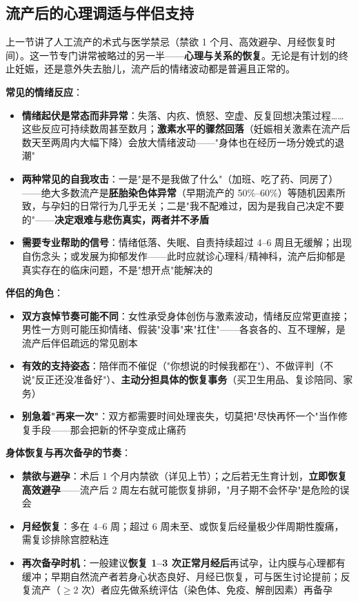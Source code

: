 \subsection{流产后的心理调适与伴侣支持}

上一节讲了人工流产的术式与医学禁忌（禁欲 1 个月、高效避孕、月经恢复时间）。这一节专门讲常被略过的另一半——\textbf{心理与关系的恢复}。无论是有计划的终止妊娠，还是意外失去胎儿，流产后的情绪波动都是普遍且正常的。

\vspace{0.5em}
\noindent\textbf{常见的情绪反应}：

\begin{itemize}
	\item \textbf{情绪起伏是常态而非异常}：失落、内疚、愤怒、空虚、反复回想决策过程……这些反应可持续数周甚至数月；\textbf{激素水平的骤然回落}（妊娠相关激素在流产后数天至两周内大幅下降）会放大情绪波动——"身体也在经历一场分娩式的退潮"
	\item \textbf{两种常见的自我攻击}：一是"是不是我做了什么"（加班、吃了药、同房了）——绝大多数流产是\textbf{胚胎染色体异常}（早期流产的 50\%--60\%）等随机因素所致，与孕妇的日常行为几乎无关；二是"我不配难过，因为是我自己决定不要的"——\textbf{决定艰难与悲伤真实，两者并不矛盾}
	\item \textbf{需要专业帮助的信号}：情绪低落、失眠、自责持续超过 4--6 周且无缓解；出现自伤念头；或发展为抑郁发作——此时应就诊心理科/精神科，流产后抑郁是真实存在的临床问题，不是"想开点"能解决的
\end{itemize}

\vspace{0.5em}
\noindent\textbf{伴侣的角色}：

\begin{itemize}
	\item \textbf{双方哀悼节奏可能不同}：女性承受身体创伤与激素波动，情绪反应常更直接；男性一方则可能压抑情绪、假装"没事"来"扛住"——各哀各的、互不理解，是流产后伴侣疏远的常见剧本
	\item \textbf{有效的支持姿态}：陪伴而不催促（"你想说的时候我都在"）、不做评判（不说"反正还没准备好"）、\textbf{主动分担具体的恢复事务}（买卫生用品、复诊陪同、家务）
	\item \textbf{别急着"再来一次"}：双方都需要时间处理丧失，切莫把"尽快再怀一个"当作修复手段——那会把新的怀孕变成止痛药
\end{itemize}

\vspace{0.5em}
\noindent\textbf{身体恢复与再次备孕的节奏}：

\begin{itemize}
	\item \textbf{禁欲与避孕}：术后 1 个月内禁欲（详见上节）；之后若无生育计划，\textbf{立即恢复高效避孕}——流产后 2 周左右就可能恢复排卵，"月子期不会怀孕"是危险的误会
	\item \textbf{月经恢复}：多在 4--6 周；超过 6 周未至、或恢复后经量极少伴周期性腹痛，需复诊排除宫腔粘连
	\item \textbf{再次备孕时机}：一般建议\textbf{恢复 1--3 次正常月经后}再试孕，让内膜与心理都有缓冲；早期自然流产者若身心状态良好、月经已恢复，可与医生讨论提前；反复流产（$\geq$2 次）者应先做系统评估（染色体、免疫、解剖因素）再备孕
\end{itemize}

